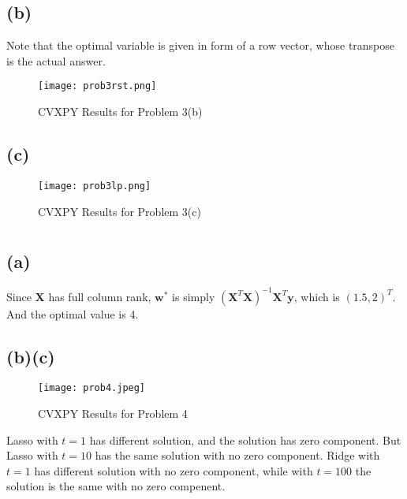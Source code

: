 \documentclass[12pt,letterpaper]{article}
\begin{document}
\subsection*{(b)}
Note that the optimal variable is given in form of a row vector, whose transpose is the actual answer.
\begin{figure}[htbp]
    \centering
    \texttt{[image: prob3rst.png]}
    \caption{\label{fig:cvxpy3} CVXPY Results for Problem 3(b)}
\end{figure}
\subsection*{(c)}
\begin{figure}[htbp]
    \centering
    \texttt{[image: prob3lp.png]}
    \caption{\label{fig:cvxpy3lp} CVXPY Results for Problem 3(c)}
\end{figure}
\section{}
\subsection*{(a)}
Since $\boldsymbol{X}$ has full column rank, $\boldsymbol{w}^*$ is simply $(\boldsymbol{X}^T\boldsymbol{X})^{-1}\boldsymbol{X}^T\boldsymbol{y}$, which is $(1.5,2)^T$. And the optimal value is 4.
\subsection*{(b)(c)}
\begin{figure}[htbp]
    \centering
    \texttt{[image: prob4.jpeg]}
    \caption{\label{fig:cvxpy4} CVXPY Results for Problem 4}
\end{figure}
Lasso with $t=1$ has different solution, and the solution has zero component. But Lasso with $t=10$ has the same solution with no zero component. Ridge with $t=1$ has different solution with no zero component, while with $t=100$ the solution is the same with no zero compenent.
\end{document}
